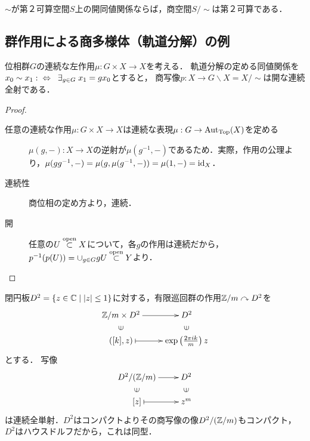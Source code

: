 \documentclass[uplatex,dvipdfmx]{jsreport}
\begin{document}
\begin{corollary}\label{cor-characterization-of-quotient-second-countable}
    $\sim$が第２可算空間$S$上の開同値関係ならば，商空間$S/\sim$は第２可算である．
\end{corollary}

\subsection{群作用による商多様体（軌道分解）の例}

\begin{lemma}[等化写像としての軌道分解]
    位相群$G$の連続な左作用$\mu:G\times X\to X$を考える．
    軌道分解の定める同値関係を$x_0\sim x_1:\;\;\Leftrightarrow\;\;\exists_{g\in G}\;x_1=gx_0$とすると，
    商写像$p:X\to G\backslash X=X/\sim$は開な連続全射である．
\end{lemma}
\begin{proof}\mbox{}
    \begin{description}
        \item[任意の連続な作用$\mu:G\times X\to X$は連続な表現$\mu:G\to\mathrm{Aut}_{\mathrm{Top}}(X)$を定める] $\mu(g,-):X\to X$の逆射が$\mu(g^{-1},-)$であるため．実際，作用の公理より，$\mu(gg^{-1},-)=\mu(g,\mu(g^{-1},-))=\mu(1,-)=\mathrm{id}_X$．
        \item[連続性] 商位相の定め方より，連続．
        \item[開] 任意の$U\overset{\mathrm{open}}{\subset} X$について，各$g$の作用は連続だから，$p^{-1}(p(U))=\cup_{g\in G}gU\overset{\mathrm{open}}{\subset} Y$より．
    \end{description}
\end{proof}

\begin{example}[円板への巡回群の連続作用による軌道分解は円錐表面になる]
    閉円板$D^2=\{z\in\mathbb{C}\mid \lvert z\rvert\le 1\}$に対する，有限巡回群の作用$\mathbb{Z}/m\curvearrowright D^2$を
    \[\xymatrix@R-2pc{
        \Z/m\times D^2\ar[r]&D^2\\
        \rotatebox[origin=c]{90}{$\in$}&\rotatebox[origin=c]{90}{$\in$}\\
        ([k],z)\ar@{|->}[r]&\exp\paren{\frac{2\pi ik}{m}}z
    }\]
    とする．
    写像
    \[\xymatrix@R-2pc{
        D^2/(\Z/m)\ar[r]&D^2\\
        \rotatebox[origin=c]{90}{$\in$}&\rotatebox[origin=c]{90}{$\in$}\\
        [z]\ar@{|->}[r]&z^m
    }\]
    は連続全単射．$D^2$はコンパクトよりその商写像の像$D^2/(\mathbb{Z}/m)$もコンパクト，$D^2$はハウスドルフだから，これは同型．
\end{example}
\end{document}
